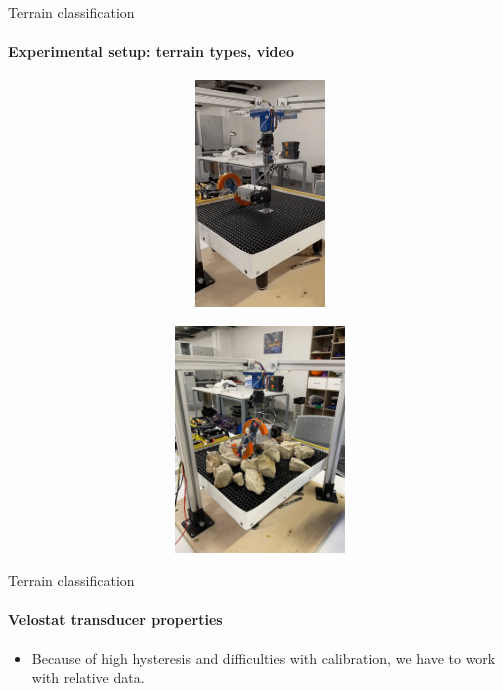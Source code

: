 \documentclass[aspectratio=169]{beamer}
\begin{document}
\begin{frame}[t]{Terrain classification}
    \framesubtitle{Experimental setup: terrain types, video}
    \vspace{-15pt}
    \begin{figure}[H]
        \begin{subfigure}{0.49\textwidth}
            \href{run:./videos/flat.gif}{\centering\includegraphics[height=6cm,width=1\textwidth,keepaspectratio]{s_shape_leg/flat.jpg}}
        \end{subfigure}
        \hfill
        \begin{subfigure}{0.49\textwidth}
            \href{run:./videos/rock.gif}{\centering\includegraphics[height=6cm,width=1\textwidth,keepaspectratio]{s_shape_leg/view.jpg}}
        \end{subfigure}
    \end{figure}
\end{frame}

\begin{frame}[t]{Terrain classification}
\framesubtitle{Velostat transducer properties}
\Large
\begin{itemize}
    \item Because of high hysteresis and difficulties with calibration, we have to work with relative data.
\end{itemize}
    
\end{frame}
\end{document}
